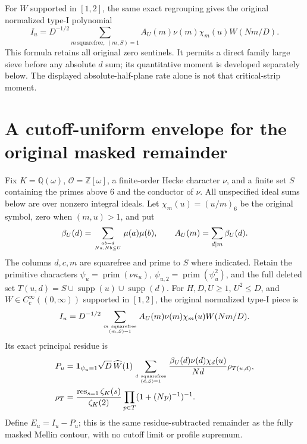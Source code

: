 \documentclass[11pt]{article}
\begin{document}
For $W$ supported in $[1,2]$, the same exact regrouping gives the
original normalized type-I polynomial
\[
 I_u=D^{-1/2}\sum_{m\ \mathrm{squarefree},\ (m,S)=1}
 A_U(m)\nu(m)\chi_m(u)W(Nm/D).
\]
This formula retains all original zero sentinels. It permits a direct
family large sieve before any absolute $d$ sum; its quantitative moment
is developed separately below. The displayed absolute-half-plane rate
alone is not that critical-strip moment.

\section{A cutoff-uniform envelope for the original masked remainder}
\label{wc:core}
Fix $K=\mathbb Q(\omega)$, $\mathcal O=\mathbb Z[\omega]$, a finite-order
Hecke character $\nu$, and a finite set $S$ containing the primes above $6$
and the conductor of $\nu$. All unspecified ideal sums below are over
nonzero integral ideals. Let $\chi_m(u)=(u/m)_6$ be the original symbol,
zero when $(m,u)>1$, and put
\[
 \beta_U(d)=\sum_{ab=d\atop Na,Nb\le U}\mu(a)\mu(b),\qquad
 A_U(m)=\sum_{d\mid m}\beta_U(d).
\]
The columns $d,c,m$ are squarefree and prime to $S$ where indicated.
Retain the primitive characters $\psi_u=\operatorname{prim}(\nu\kappa_u)$,
$\psi_{u,2}=\operatorname{prim}(\psi_u^2)$, and the full deleted set
$T(u,d)=S\cup\operatorname{supp}(u)\cup\operatorname{supp}(d)$.
For $H,D,U\ge1$, $U^2\le D$, and $W\in C_c^\infty((0,\infty))$
supported in $[1,2]$, the original normalized type-I piece is
\begin{equation}\label{wc:polynomial}
 I_u=D^{-1/2}\sum_{m\ \mathrm{squarefree}\atop(m,S)=1}
     A_U(m)\nu(m)\chi_m(u)W(Nm/D).
\end{equation}
Its exact principal residue is
\begin{align}\label{wc:principal}
 P_u&=\mathbf1_{\psi_u=1}\sqrt D\,\widehat W(1)
 \sum_{d\ \mathrm{squarefree}\atop(d,S)=1}
 \frac{\beta_U(d)\nu(d)\chi_d(u)}{Nd}\rho_{T(u,d)},\notag\\
 \rho_T&=\frac{\operatorname*{res}_{s=1}\zeta_K(s)}{\zeta_K(2)}
               \prod_{p\in T}(1+(Np)^{-1})^{-1}.
\end{align}
Define $E_u=I_u-P_u$; this is the same residue-subtracted remainder as the
fully masked Mellin contour, with no cutoff limit or profile supremum.
\end{document}
